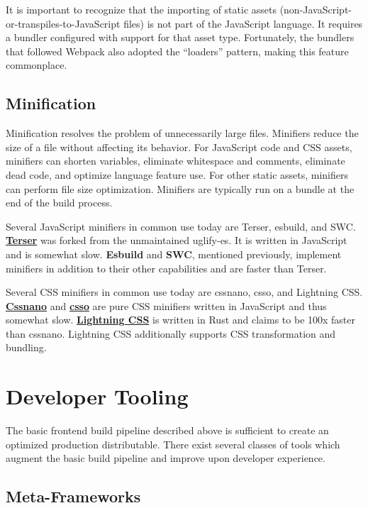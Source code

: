 \documentclass{article}
\begin{document}
It is important to recognize that the importing of static assets
(non-JavaScript-or-transpiles-to-JavaScript files) is not part of the JavaScript language. It
requires a bundler configured with support for that asset type. Fortunately, the bundlers that
followed Webpack also adopted the ``loaders'' pattern, making this feature commonplace.

\subsection{Minification}

Minification resolves the problem of unnecessarily large files. Minifiers reduce the size of a file
without affecting its behavior. For JavaScript code and CSS assets, minifiers can shorten variables,
eliminate whitespace and comments, eliminate dead code, and optimize language feature use. For other
static assets, minifiers can perform file size optimization. Minifiers are typically run on a bundle
at the end of the build process.

Several JavaScript minifiers in common use today are Terser, esbuild, and SWC.
\href{https://terser.org/}{\textbf{Terser}} was forked from the unmaintained uglify-es. It is
written in JavaScript and is somewhat slow. \textbf{Esbuild} and \textbf{SWC}, mentioned previously,
implement minifiers in addition to their other capabilities and are faster than Terser.

Several CSS minifiers in common use today are cssnano, csso, and Lightning CSS.
\href{https://cssnano.github.io/cssnano/}{\textbf{Cssnano}} and
\href{https://github.com/css/csso}{\textbf{csso}} are pure CSS minifiers written in JavaScript and
thus somewhat slow. \href{https://lightningcss.dev/}{\textbf{Lightning CSS}} is written in Rust and
claims to be 100x faster than cssnano. Lightning CSS additionally supports CSS transformation and
bundling.

\section{Developer Tooling}

The basic frontend build pipeline described above is sufficient to create an optimized production
distributable. There exist several classes of tools which augment the basic build pipeline and
improve upon developer experience.

\subsection{Meta-Frameworks}
\end{document}

